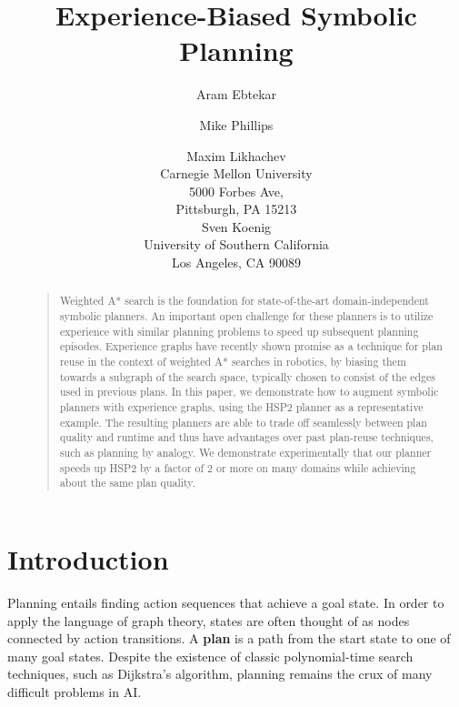 \documentclass[letterpaper]{article}
\begin{document}
%
\title{Experience-Biased Symbolic Planning}
\author{Aram Ebtekar \and Mike Phillips \and Maxim Likhachev\\
Carnegie Mellon University\\
5000 Forbes Ave,\\
Pittsburgh, PA 15213\\
\And Sven Koenig\\
University of Southern California\\
Los Angeles, CA 90089
}
\maketitle
\begin{abstract}
\begin{quote}
Weighted A* search is the foundation for state-of-the-art domain-independent symbolic planners.
An important open challenge for these planners is to utilize experience with similar planning problems to speed up subsequent planning episodes.
Experience graphs have recently shown promise as a technique for plan reuse in the context of weighted A* searches in robotics, by biasing them towards a subgraph of the search space, typically chosen to consist of the edges used in previous plans.
In this paper, we demonstrate how to augment symbolic planners with
experience graphs, using the HSP2 planner as a representative
example.
The resulting planners are able to trade off seamlessly
between plan quality and runtime and thus have advantages over past
plan-reuse techniques, such as planning by analogy.
We demonstrate
experimentally that our planner speeds up HSP2 by a factor of 2 or more on
many domains while achieving about the same plan quality.
\end{quote}
\end{abstract}

\section{Introduction}
Planning entails finding action sequences that achieve a goal state.
In order to apply the language of graph theory, states are often thought of as nodes connected by action transitions.
A \textbf{plan} is a path from the start state to one of many goal states.
Despite the existence of classic polynomial-time search techniques, such as Dijkstra's algorithm, planning remains the crux of many difficult problems in AI.
\end{document}
